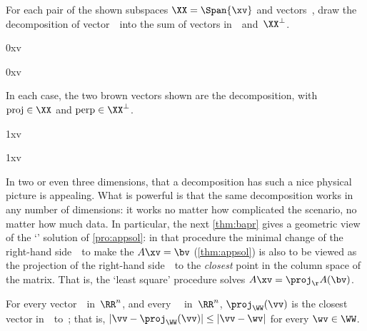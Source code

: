 \begin{example} 
For each pair of the shown subspaces \(\XX=\Span\{\xv\}\) and  vectors~\vv, draw the decomposition of vector~\vv\ into the sum of vectors in~\XX\ and~\(\XX^\perp\).
\begin{Parts}
\item {}0xv
\item {}0xv
\end{Parts}
\begin{solution} 
In each case, the two brown vectors shown are the decomposition, with \(\text{proj}\in\XX\) and \(\text{perp}\in\XX^\perp\).
\begin{Parts}
\item {}1xv
\item {}1xv
\end{Parts} 
\end{solution}
\end{example}

In two or even three dimensions, that a decomposition has such a nice physical picture is appealing.
What is powerful is that the same decomposition works in any number of dimensions: it works no matter how complicated the scenario, no matter how much data.
In particular, the next \cref{thm:bapr} gives a geometric view of the `' solution of \cref{pro:appsol}: 
in that procedure the minimal change of the right-hand side~\bv\ to make the  \(A\xv=\bv\)  (\cref{thm:appsol}) is also to be viewed as the projection of the right-hand side~\bv\ to the \emph{closest} point in the column space of the matrix.
That is, the `least square' procedure solves \(A\xv=\proj_\AA(\bv)\).

\begin{theorem} \label{thm:bapr}
For every vector~\vv\ in~\(\RR^n\), and every ~\WW\ in~\(\RR^n\),  \(\proj_\WW(\vv)\) is the closest vector in~\WW\ to~\vv; that is,  \(|\vv-\proj_\WW(\vv)|\leq|\vv-\wv|\) for every \(\wv\in\WW\).\end{theorem}

